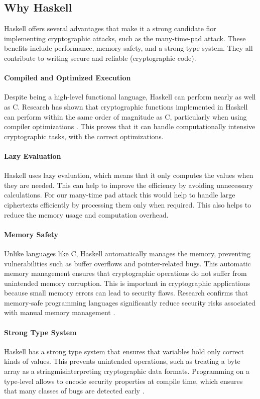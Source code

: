 \subsection{Why Haskell}\label{sec:why_haskell}
Haskell offers several advantages that make it a strong candidate fior implementing cryptographic attacks, such as the many-time-pad attack. These benefits include performance, memory safety, and a strong type system. They all contribute to writing secure and reliable (cryptographic code). 

\paragraph{Compiled and Optimized Execution} Despite being a high-level functional language, Haskell can perform nearly as well as C. Research has shown that cryptographic functions implemented in Haskell can perform within the same order of magnitude as C, particularly when using compiler optimizations \cite{Ankner2013}. This proves that it can handle computationally intensive cryptographic tasks, with the correct optimizations.

\paragraph{Lazy Evaluation} Haskell uses lazy evaluation, which means that it only computes the values when they are needed. This can help to improve the efficiency by avoiding unnecessary calculations. For our many-time pad attack this would help to handle large ciphertexts efficiently by processing them only when required. This also helps to reduce the memory usage and computation overhead.

\paragraph{Memory Safety}
Unlike languages like C, Haskell automatically manages the memory, preventing vulnerabilities such as buffer overflows and pointer-related bugs. This automatic memory management ensures that cryptographic operations do not suffer from unintended memory corruption. This is important in cryptographic applications because small memory errors can lead to security flaws. Research confirms that memory-safe programming languages significantly reduce security risks associated with manual memory management \cite{Dwivedi2021}. 

\paragraph{Strong Type System}
Haskell has a strong type system that ensures that variables hold only correct kinds of values. This prevents unintended operations, such as treating a byte array as a stringmisinterpreting cryptographic data formats. Programming on a type-level allows to encode security properties at compile time, which ensures that many classes of bugs are detected early \cite{Barbosa2011}.


